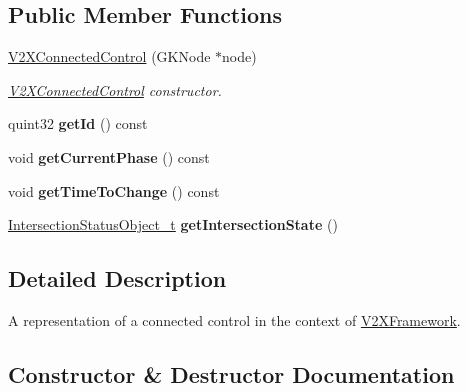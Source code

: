 \subsection*{Public Member Functions}
\begin{DoxyCompactItemize}
\item 
\hyperlink{classV2XConnectedControl_a20fb3c55901eea891a5f3353da2fc45d}{V2\+X\+Connected\+Control} (G\+K\+Node $\ast$node)
\begin{DoxyCompactList}\small\item\em \hyperlink{classV2XConnectedControl}{V2\+X\+Connected\+Control} constructor. \end{DoxyCompactList}\item 
quint32 {\bfseries get\+Id} () const \hypertarget{classV2XConnectedControl_a1e08b2c5ee1d166fab5bc3f1635d341a}{}\label{classV2XConnectedControl_a1e08b2c5ee1d166fab5bc3f1635d341a}

\item 
void {\bfseries get\+Current\+Phase} () const \hypertarget{classV2XConnectedControl_aa7d5a5442a035c81851d2a963577985d}{}\label{classV2XConnectedControl_aa7d5a5442a035c81851d2a963577985d}

\item 
void {\bfseries get\+Time\+To\+Change} () const \hypertarget{classV2XConnectedControl_ae1185102af2a5b619bafbbc54dd9ff5e}{}\label{classV2XConnectedControl_ae1185102af2a5b619bafbbc54dd9ff5e}

\item 
\hyperlink{structBIT__STRING__s}{Intersection\+Status\+Object\+\_\+t} {\bfseries get\+Intersection\+State} ()\hypertarget{classV2XConnectedControl_afb267923ffd9c56b9e5c982d8e3a0ec6}{}\label{classV2XConnectedControl_afb267923ffd9c56b9e5c982d8e3a0ec6}

\end{DoxyCompactItemize}


\subsection{Detailed Description}
A representation of a connected control in the context of \hyperlink{classV2XFramework}{V2\+X\+Framework}. 

\subsection{Constructor \& Destructor Documentation}
